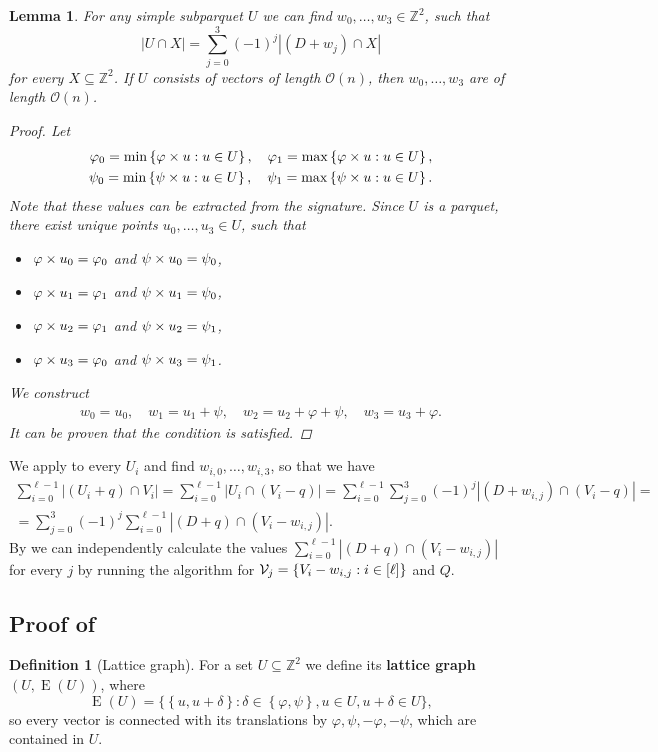 \documentclass[11pt]{article}
\newcommand{\Z}{\mathbb{Z}}
\renewcommand{\O}{\mathcal{O}}
\renewcommand{\phi}{\varphi}
\newcommand{\set}[1]{\left\lbrace #1 \right\rbrace}
\newcommand{\bigset}[1]{\big \lbrace #1 \big \rbrace}
\newcommand{\eq}[1]{\begin{align*} #1 \end{align*}}
\theoremstyle{plain}
\newtheorem{lemma}{Lemma}
\theoremstyle{definition}
\newtheorem{definition}{Definition}
\theoremstyle{remark}
\DeclareMathOperator*{\Edges}{E}
\begin{document}
\begin{lemma}\label{primitive}
	For any simple subparquet $U$ we can find $w_0, \dots, w_3 \in \Z^2$, such that
	$$ |U \cap X| = \sum_{j = 0}^3 (-1)^j |(D + w_j) \cap X|$$
	for every $X \subseteq \Z^2$.
	If $U$ consists of vectors of length $\O(n)$, then $w_0, \dots, w_3$ are of length $\O(n)$.
	\begin{proof}
		Let \eq{
			\phi_0 = \min\set{{\h{u} : u \in U}}, \quad 
			\phi_1 = \max\set{{\h{u} : u \in U}},\\
			\psi_0 = \min\set{{\s{u} : u \in U}}, \quad
			\psi_1 = \max\set{{\s{u} : u \in U}}.
		}
		Note that these values can be extracted from the signature.
		Since $U$ is a parquet, there exist unique points $u_0, \dots, u_3 \in U$, such that
		\begin{itemize}
			\item $\h{u_0} = \phi_0$ and $\psi \times u_0 = \psi_0$,
			\item $\h{u_1} = \phi_1$ and $\psi \times u_1 = \psi_0$,
			\item $\h{u_2} = \phi_1$ and $\psi \times u_2 = \psi_1$,
			\item $\h{u_3} = \phi_0$ and $\psi \times u_3 = \psi_1$.
		\end{itemize}
		We construct \eq{
			w_0 = u_0, \quad 
			w_1 = u_1 + \psi, \quad
			w_2 = u_2 + \phi + \psi, \quad
			w_3 = u_3 + \phi.
		}
		It can be proven that the condition is satisfied.
	\end{proof}
\end{lemma}

We apply  to every $U_i$ and find $w_{i, 0}, \dots, w_{i, 3}$, so that we have
\eq{
	\sum_{i = 0}^{\ell - 1}|(U_i + q) \cap V_i| 
= \sum_{i = 0}^{\ell - 1}|U_i \cap (V_i - q)| 
= \sum_{i = 0}^{\ell - 1} \sum_{j = 0}^3 (-1)^j |(D + w_{i, j}) \cap (V_i - q)| = \\
= \sum_{j = 0}^3 (-1)^j \sum_{i = 0}^{\ell - 1} |(D + q) \cap (V_i - w_{i, j})|.
}
By  we can independently calculate the values $\sum_{i = 0}^{\ell - 1} |(D + q) \cap (V_i - w_{i, j})|$ for every $j$ by running the algorithm for $\V_j = \set{V_i - w_{i, j} : i \in [\ell]}$ and $Q$.


\subsection{Proof of } \label{parquet_decomposition_proof}


\begin{definition}[Lattice graph]
	For a set $U \subseteq \Z^2$ we define its \textbf{lattice graph} $(U, \Edges(U))$, where
	$$ \Edges(U) = \bigset{\set{u, u + \delta} : \delta \in \set{\phi, \psi}, u \in U, u + \delta \in U},$$ 
	so every vector is connected with its translations by $\phi, \psi, -\phi, -\psi$, which are contained in $U$.
\end{definition}
\end{document}
